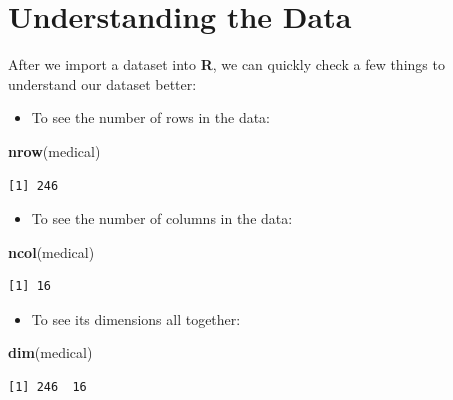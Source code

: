 \documentclass[]{book}
\newenvironment{Shaded}{\begin{snugshade}}{\end{snugshade}}
\newcommand{\KeywordTok}[1]{\textcolor[rgb]{0.13,0.29,0.53}{\textbf{#1}}}
\newcommand{\NormalTok}[1]{#1}
\providecommand{\tightlist}{%
  \setlength{\itemsep}{0pt}\setlength{\parskip}{0pt}}
\begin{document}
\hypertarget{understanding-the-data}{%
\section{Understanding the Data}\label{understanding-the-data}}

After we import a dataset into \textbf{R}, we can quickly check a few things to understand our dataset better:

\begin{itemize}
\tightlist
\item
  To see the number of rows in the data:
\end{itemize}

\begin{Shaded}
\begin{Highlighting}[]
\KeywordTok{nrow}\NormalTok{(medical)}
\end{Highlighting}
\end{Shaded}

\begin{verbatim}
[1] 246
\end{verbatim}

\begin{itemize}
\tightlist
\item
  To see the number of columns in the data:
\end{itemize}

\begin{Shaded}
\begin{Highlighting}[]
\KeywordTok{ncol}\NormalTok{(medical)}
\end{Highlighting}
\end{Shaded}

\begin{verbatim}
[1] 16
\end{verbatim}

\begin{itemize}
\tightlist
\item
  To see its dimensions all together:
\end{itemize}

\begin{Shaded}
\begin{Highlighting}[]
\KeywordTok{dim}\NormalTok{(medical)}
\end{Highlighting}
\end{Shaded}

\begin{verbatim}
[1] 246  16
\end{verbatim}
\end{document}
